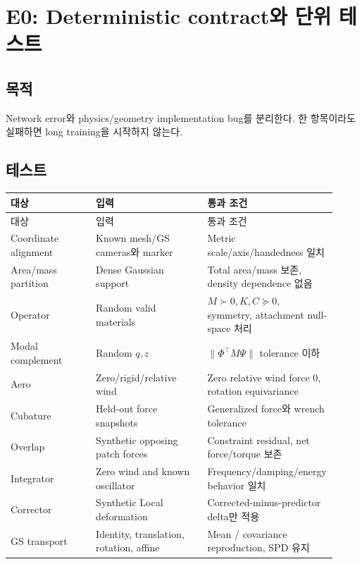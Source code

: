 \documentclass[11pt,a4paper]{article}
\begin{document}
\section{E0: Deterministic contract와 단위 테스트}

\subsection*{목적}

Network error와 physics/geometry implementation bug를 분리한다.
한 항목이라도 실패하면 long training을 시작하지 않는다.

\subsection*{테스트}

\begin{longtable}{L{0.26\linewidth}L{0.34\linewidth}L{0.32\linewidth}}
\toprule
대상 & 입력 & 통과 조건 \\
\midrule
\endfirsthead
\toprule
대상 & 입력 & 통과 조건 \\
\midrule
\endhead
Coordinate alignment & Known mesh/GS cameras와 marker & Metric scale/axis/handedness 일치 \\
\addlinespace
Area/mass partition & Dense Gaussian support & Total area/mass 보존, density dependence 없음 \\
\addlinespace
Operator & Random valid materials & \(M\succ0,K,C\succeq0\), symmetry, attachment null-space 처리 \\
\addlinespace
Modal complement & Random \(q,z\) & \(\|\Phi^\top M\Psi\|\) tolerance 이하 \\
\addlinespace
Aero & Zero/rigid/relative wind & Zero relative wind force 0, rotation equivariance \\
\addlinespace
Cubature & Held-out force snapshots & Generalized force와 wrench tolerance \\
\addlinespace
Overlap & Synthetic opposing patch forces & Constraint residual, net force/torque 보존 \\
\addlinespace
Integrator & Zero wind and known oscillator & Frequency/damping/energy behavior 일치 \\
\addlinespace
Corrector & Synthetic Local deformation & Corrected-minus-predictor delta만 적용 \\
\addlinespace
GS transport & Identity, translation, rotation, affine & Mean / covariance reproduction, SPD 유지 \\
\bottomrule
\end{longtable}
\end{document}
